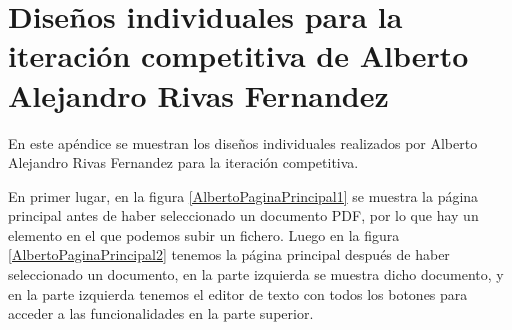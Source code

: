 \chapter{Diseños individuales para la iteración competitiva de Alberto Alejandro Rivas Fernandez}
\label{ape:disenyoAlberto}

En este apéndice se muestran los diseños individuales realizados por Alberto Alejandro Rivas Fernandez para la iteración competitiva.

En primer lugar, en la figura \ref{AlbertoPaginaPrincipal1} se muestra la página principal antes de haber seleccionado un documento PDF, por lo que hay un elemento en el que podemos subir un fichero. Luego en la figura \ref{AlbertoPaginaPrincipal2}  tenemos la página principal después de haber seleccionado un documento, en la parte izquierda se muestra dicho documento, y en la parte izquierda tenemos el editor de texto con todos los botones para acceder a las funcionalidades en la parte superior. 


